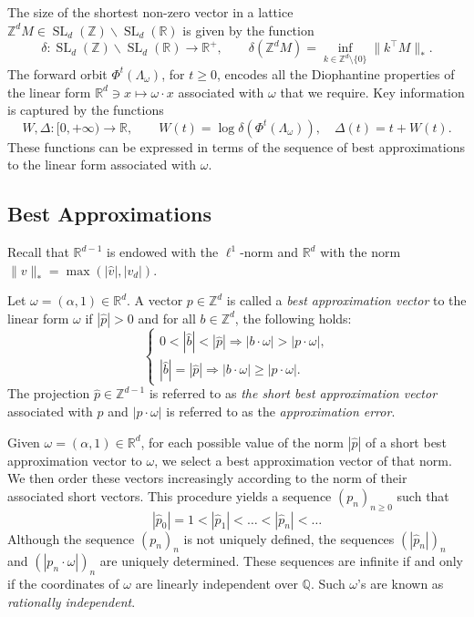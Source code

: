 \documentclass[12pt,reqno,a4paper]{amsart}%
\numberwithin{equation}{section}
\newcommand{\Rr}{{\mathbb{R}}}
\newcommand{\Zz}{{\mathbb{Z}}}
\def\SL{\operatorname{SL}}
\def\SLZ{\SL_d(\Zz)}
\def\SLR{\SL_d(\Rr)}
\def\veck{{\text{\boldmath$k$}}}
\def\veck{{\text{$k$}}}
\begin{document}
	
	
	The size of the shortest non-zero vector in a lattice $\Zz^dM\in \SLZ\backslash \SLR$ is given by the function  
	\begin{equation}
		\delta\colon  \SLZ\backslash\SLR\to\Rr^+,
		\qquad
		\delta(\Zz^dM)=\inf_{\veck\in\Zz^d\setminus \{0\}} \| k^\top M\|_*.
	\end{equation}
		The forward orbit $\Phi^t(\Lambda_{\omega})$, for $t \geq 0$, encodes all the Diophantine properties of the linear form $\Rr^d\ni x\mapsto \omega\cdot x$ associated with $\omega$ that we require. Key information is captured by the functions
	\[
	W,\Delta\colon[0,+\infty) \to \Rr, \qquad W(t) = \log \delta(\Phi^t(\Lambda_{\omega})), \quad \Delta(t) = t + W(t).
	\]
	These functions can be expressed in terms of the sequence of best approximations to the linear form associated with $\omega$.
	
	\subsection{Best Approximations}
	
	Recall that $\Rr^{d-1}$ is endowed with the $\ell^1$-norm and $\Rr^d$ with the norm $\|v\|_* = \max(|\hat v|, |v_d|)$.
	
	\begin{defn}
		Let $\omega = (\alpha,1) \in \Rr^d$. A vector $p \in \Zz^d$ is called a \emph{best approximation vector} to the linear form $\omega$ if $|\hat p| > 0$ and for all $b \in \Zz^d$, the following holds:
		\[	
		\left\{\begin{array}{ll}
			0 < |\hat b| < |\hat p| \Rightarrow |b \cdot \omega| > |p \cdot \omega|,\\
			|\hat b| = |\hat p| \Rightarrow |b \cdot \omega| \geq |p \cdot \omega|.
		\end{array}
		\right.
		\]
		The  projection $\hat p\in\Zz^{d-1}$ is referred to as \emph{the short best approximation vector} associated with $p$ and $|p \cdot \omega|$ is referred to as the \emph{approximation error}.
	\end{defn}
	Given $\omega =(\alpha,1)\in \mathbb{R}^d$,  for each possible value of the norm $|\hat{p}|$ of a short best approximation vector to $\omega$, we select a best approximation vector of that norm. We then order these vectors increasingly according to the norm of their associated short vectors. This procedure yields a sequence $(p_n)_{n\geq 0}$ such that
	\[
	|\hat p_0| = 1 < |\hat p_1| < \dots < |\hat p_n| < \dots
	\]
	Although the sequence $(p_n)_n$ is not uniquely defined, the sequences $(|\hat{p}_n|)_n$ and $(|p_n \cdot \omega|)_n$ are uniquely determined. These sequences are infinite if and only if the coordinates of $\omega$ are linearly independent over $\mathbb{Q}$.  Such $\omega$'s are known as \textit{rationally independent}.
	
\end{document}
